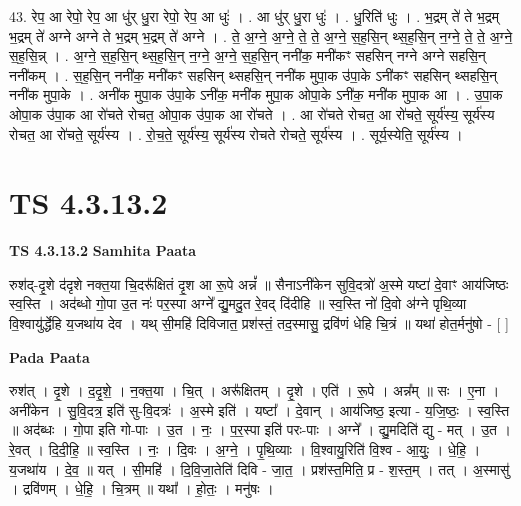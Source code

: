 \documentclass[17pt]{extarticle}
\begin{document}
43. रेप॒ आ रेपो॒ रेप॒ आ धु॑र् धु॒रा रेपो॒ रेप॒ आ धुः॑ । . आ धु॑र् धु॒रा धुः॑ । . धु॒रिति॑ धुः । . भ॒द्रम् ते॑ ते भ॒द्रम् भ॒द्रम् ते॑ अग्ने अग्ने ते भ॒द्रम् भ॒द्रम् ते॑ अग्ने । . ते॒ अ॒ग्ने॒ अ॒ग्ने॒ ते॒ ते॒ अ॒ग्ने॒ स॒ह॒सि॒न् थ्स॒ह॒सि॒न् न॒ग्ने॒ ते॒ ते॒ अ॒ग्ने॒ स॒ह॒सि॒न्न् । . अ॒ग्ने॒ स॒ह॒सि॒न् थ्स॒ह॒सि॒न् न॒ग्ने॒ अ॒ग्ने॒ स॒ह॒सि॒न् ननी॑क॒ मनी॑कꣳ सहसिन् नग्ने अग्ने सहसि॒न् ननी॑कम् । . स॒ह॒सि॒न् ननी॑क॒ मनी॑कꣳ सहसिन् थ्सहसि॒न् ननी॑क मुपा॒क उ॑पा॒के ऽनी॑कꣳ सहसिन् थ्सहसि॒न् ननी॑क मुपा॒के । . अनी॑क मुपा॒क उ॑पा॒के ऽनी॑क॒ मनी॑क मुपा॒क ओपा॒के ऽनी॑क॒ मनी॑क मुपा॒क आ । . उ॒पा॒क ओपा॒क उ॑पा॒क आ रो॑चते रोचत॒ ओपा॒क उ॑पा॒क आ रो॑चते । . आ रो॑चते रोचत॒ आ रो॑चते॒ सूर्य॑स्य॒ सूर्य॑स्य रोचत॒ आ रो॑चते॒ सूर्य॑स्य । . रो॒च॒ते॒ सूर्य॑स्य॒ सूर्य॑स्य रोचते रोचते॒ सूर्य॑स्य । . सूर्य॒स्येति॒ सूर्य॑स्य । \newline
\pagebreak
{}

\section{ TS 4.3.13.2 }

\textbf{TS 4.3.13.2 } \newline
\textbf{Samhita Paata} \newline

रुश॑द्-दृ॒शे द॑दृशे नक्त॒या चि॒दरू᳚क्षितं दृ॒श आ रू॒पे अन्नं᳚ ॥ सैनाऽनी॑केन सुवि॒दत्रो॑ अ॒स्मे यष्टा॑ दे॒वाꣳ आय॑जिष्ठः स्व॒स्ति । अद॑ब्धो गो॒पा उ॒त नः॑ पर॒स्पा अग्ने᳚ द्यु॒मदु॒त रे॒वद् दि॑दीहि ॥ स्व॒स्ति नो॑ दि॒वो अ॑ग्ने पृथि॒व्या वि॒श्वायु॑र्द्धेहि य॒जथा॑य देव । यथ् सी॒महि॑ दिविजात॒ प्रश॑स्तं॒ तद॒स्मासु॒ द्रवि॑णं धेहि चि॒त्रं ॥ यथा॑ होत॒र्मनु॑षो - [  ] \newline

\textbf{Pada Paata} \newline

रुश॑त् । दृ॒शे । द॒दृ॒शे॒ । न॒क्त॒या । चि॒त् । अरू᳚क्षितम् । दृ॒शे । एति॑ । रू॒पे । अन्न᳚म् ॥ सः । ए॒ना । अनी॑केन । सु॒वि॒दत्र॒ इति॑ सु-वि॒दत्रः॑ । अ॒स्मे इति॑ । यष्टा᳚ । दे॒वान् । आय॑जिष्ठ॒ इत्या - य॒जि॒ष्ठः॒ । स्व॒स्ति ॥ अद॑ब्धः । गो॒पा इति गो-पाः । उ॒त । नः॒ । प॒र॒स्पा इति॑ परः-पाः । अग्ने᳚ । द्यु॒मदिति॑ द्यु - मत् । उ॒त । रे॒वत् । दि॒दी॒हि॒ ॥ स्व॒स्ति । नः॒ । दि॒वः । अ॒ग्ने॒ । पृ॒थि॒व्याः । वि॒श्वायु॒रिति॑ वि॒श्व - आ॒युः॒ । धे॒हि॒ । य॒जथा॑य । दे॒व॒ ॥ यत् । सी॒महि॑ । दि॒वि॒जा॒तेति॑ दिवि - जा॒त॒ । प्रश॑स्त॒मिति॒ प्र - श॒स्त॒म् । तत् । अ॒स्मासु॑ । द्रवि॑णम् । धे॒हि॒ । चि॒त्रम् ॥ यथा᳚ । हो॒तः॒ । मनु॑षः ।  \newline
\end{document}

